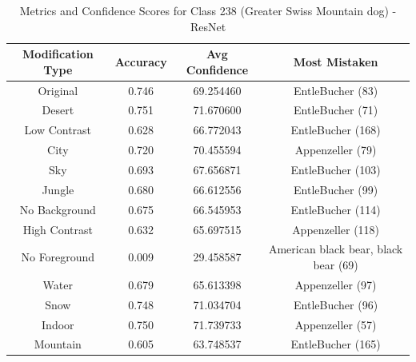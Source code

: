\begin{table}
	\centering
	\begin{tabular}{|c|c|c|c|}
		\hline
		\textbf{Modification Type} & \textbf{Accuracy} & \textbf{Avg Confidence} & \textbf{Most Mistaken} \\
		\hline
		Original & 0.746 & 69.254460 & EntleBucher (83) \\
		\hline
		Desert & 0.751 & 71.670600 & EntleBucher (71) \\
		\hline
		Low Contrast & 0.628 & 66.772043 & EntleBucher (168) \\
		\hline
		City & 0.720 & 70.455594 & Appenzeller (79) \\
		\hline
		Sky & 0.693 & 67.656871 & EntleBucher (103) \\
		\hline
		Jungle & 0.680 & 66.612556 & EntleBucher (99) \\
		\hline
		No Background & 0.675 & 66.545953 & EntleBucher (114) \\
		\hline
		High Contrast & 0.632 & 65.697515 & Appenzeller (118) \\
		\hline
		No Foreground & 0.009 & 29.458587 & American black bear, black bear (69) \\
		\hline
		Water & 0.679 & 65.613398 & Appenzeller (97) \\
		\hline
		Snow & 0.748 & 71.034704 & EntleBucher (96) \\
		\hline
		Indoor & 0.750 & 71.739733 & Appenzeller (57) \\
		\hline
		Mountain & 0.605 & 63.748537 & EntleBucher (165) \\
		\hline
	\end{tabular}
	\caption{Metrics and Confidence Scores for Class 238 (Greater Swiss Mountain dog) - ResNet}
	\label{tab:metrics_confidence_class_238_resnet}
\end{table}

